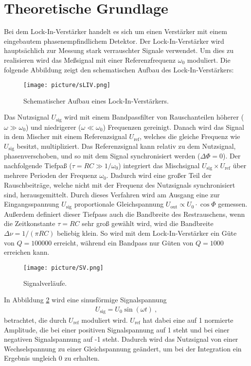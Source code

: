 \section{Theoretische Grundlage}
\label{sec:Theorie}
Bei dem Lock-In-Verstärker handelt es sich um einen Verstärker mit einem eingebautem phasenempfindlichem Detektor. Der Lock-In-Verstärker wird hauptsächlich zur Messung stark verrauschter Signale verwendet. Um dies zu realisieren wird das Meßsignal mit einer Referenzfrequenz $\omega_\text{0}$ moduliert. Die folgende Abbildung zeigt den schematischen Aufbau des Lock-In-Verstärkers:
\begin{figure}[H]
	\centering
	\texttt{[image: picture/sLIV.png]}
	\caption{Schematischer Aufbau eines Lock-In-Verstärkers. \cite[1]{sample}}
  \label{img:sLIV}
\end{figure}
Das Nutzsignal $U_\text{sig}$ wird mit einem Bandpassfilter von Rauschanteilen höherer ($\omega \gg \omega_\text{0}$) und niedrigerer ($\omega \ll \omega_\text{0}$) Frequenzen gereinigt. Danach wird das Signal in dem Mischer mit einem Referenzsignal $U_\text{ref}$, welches die gleiche Frequenz wie $U_\text{sig}$ besitzt, multipliziert. Das Referenzsignal kann relativ zu dem Nutzsignal, phasenverschoben, und so mit dem Signal synchronisiert werden ($\Delta \Phi = 0$). Der nachfolgende Tiefpaß ($\tau = RC \gg 1/ \omega_\text{0}$) integriert das Mischsignal $U_\text{sig} \times U_\text{ref}$
über mehrere Perioden der Frequenz $\omega_\text{0}$. Dadurch wird eine großer Teil der Rauschbeiträge, welche nicht mit der Frequenz des Nutzsignals synchronisiert sind, herausgemittelt. Durch dieses Verfahren wird am Ausgang eine zur Eingangsspannung $U_\text{sig}$ proportionale Gleichspannung $U_\text{out} \propto U_\text{0} \cdot \cos \Phi$ gemessen. Außerdem definiert dieser Tiefpass auch die Bandbreite des Restrauschens, wenn die Zeitkonstante $\tau = RC$ sehr groß gewählt wird, wird die Bandbreite $\Delta \nu = 1/(\pi RC)$ beliebig klein. So wird mit dem Lock-In-Verstärker ein Güte von $Q = 100000$ erreicht, während ein Bandpass nur Güten von $Q = 1000$ erreichen kann.
\begin{figure}[H]
	\centering
	\texttt{[image: picture/SV.png]}
	\caption{Signalverläufe. \cite[2]{sample}}
  \label{img:SV}
\end{figure}
In Abbildung \ref{img:SV} wird eine sinusförmige Signalspannung
\begin{align}
	U_\text{sig} = U_\text{0} \sin(\omega t) \ ,
\end{align}
betrachtet, die durch $U_\text{ref}$ moduliert wird. $U_\text{ref}$ hat dabei eine auf 1 normierte Amplitude, die bei einer positiven Signalspannung auf 1 steht und bei einer negativen Signalspannung auf -1 steht. Dadurch wird das Nutzsignal von einer Wechselspannung zu einer Gleichspannung geändert, um bei der Integration ein Ergebnis ungleich 0 zu erhalten.
